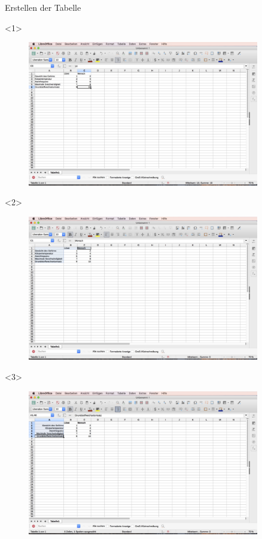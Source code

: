 \begin{frame}[c]{Erstellen der Tabelle}
	\begin{onlyenv}
		\begin{figure}[htbp]
			\centering
			\includegraphics[width=0.9\textwidth]{img/Bildschirmfoto_mitKasten/3_Tabelle/1.jpg}
		\end{figure}
	\end{onlyenv}
	\begin{onlyenv}
		\begin{figure}[htbp]
			\centering
			\includegraphics[width=0.9\textwidth]{img/Bildschirmfoto_mitKasten/3_Tabelle/2.jpg}
		\end{figure}
	\end{onlyenv}
	\begin{onlyenv}
		\begin{figure}[htbp]
			\centering
			\includegraphics[width=0.9\textwidth]{img/Bildschirmfoto_mitKasten/3_Tabelle/3.jpg}

\end{figure}
\end{onlyenv}
\end{frame}
